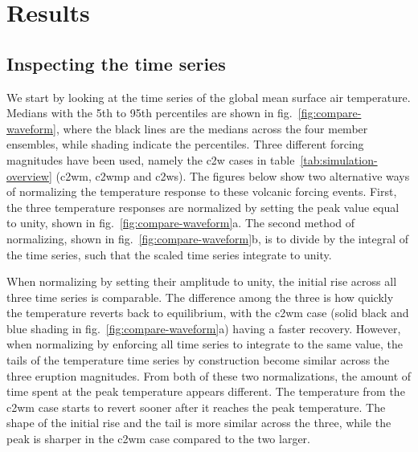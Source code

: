 \documentclass{ametsocV6.1}
\begin{document}
\section{Results}\label{sec:results}


\subsection{Inspecting the time series}

We start by looking at the time series of the global mean surface air temperature.
Medians with the 5th to 95th percentiles are shown in fig.~\ref{fig:compare-waveform},
where the black lines are the medians across the four member ensembles, while shading
indicate the percentiles. Three different forcing magnitudes have been used, namely the
\gls{c2w} cases in table~\ref{tab:simulation-overview} (\gls{c2wm}, \gls{c2wmp} and
\gls{c2ws}). The figures below show two alternative ways of normalizing the temperature
response to these volcanic forcing events. First, the three temperature responses are
normalized by setting the peak value equal to unity, shown in
fig.~\ref{fig:compare-waveform}a. The second method of normalizing, shown in
fig.~\ref{fig:compare-waveform}b, is to divide by the integral of the time series, such
that the scaled time series integrate to unity.

When normalizing by setting their amplitude to unity, the initial rise across all three
time series is comparable. The difference among the three is how quickly the temperature
reverts back to equilibrium, with the \gls{c2wm} case (solid black and blue shading in
fig.~\ref{fig:compare-waveform}a) having a faster recovery. However, when normalizing by
enforcing all time series to integrate to the same value, the tails of the temperature
time series by construction become similar across the three eruption magnitudes. From
both of these two normalizations, the amount of time spent at the peak temperature
appears different. The temperature from the \gls{c2wm} case starts to revert sooner
after it reaches the peak temperature. The shape of the initial rise and the tail is
more similar across the three, while the peak is sharper in the \gls{c2wm} case compared
to the two larger.
\end{document}
